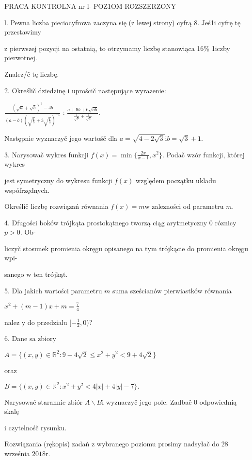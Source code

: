 \documentclass[a4paper,12pt]{article}
\begin{document}
PRACA KONTROLNA nr l- POZ1OM ROZSZERZONY

l. Pewna liczba pieciocyfrowa zaczyna się ($\mathrm{z}$ lewej strony) cyfrą 8. Jeś1i cyfrę tę przestawimy

$\mathrm{z}$ pierwszej pozycji na ostatnią, to otrzymamy liczbę stanowiąca 16\% 1iczby pierwotnej.

Znalez/č tę liczbę.

2. Określič dziedzinę $\mathrm{i}$ uprościč następujące wyrazenie:

$\displaystyle \frac{(\sqrt{a}+\sqrt{b})^{2}-4b}{(a-b)(\sqrt{\frac{1}{b}}+3\sqrt{\frac{1}{a}})^{-1}}$ : $\displaystyle \frac{a+9b+6\sqrt{ab}}{\frac{1}{\sqrt{b}}+\frac{1}{\sqrt{a}}}.$

Następnie wyznaczyč jego wartośč dla $a=\sqrt{4-2\sqrt{3}} \mathrm{i} b=\sqrt{3}+1.$

3. Narysowač wykres funkcji $f(x) = \displaystyle \min\{\frac{2x}{x-1},x^{2}\}$. Podač wzór funkcji, której wykres

jest symetryczny do wykresu funkcji $f(x)$ względem początku ukladu wspófrzędnych.

Określič liczbę rozwiązań równania $f(x)=m\mathrm{w}$ zalezności od parametru $m.$

4. Dfugości boków trójkąta prostokątnego tworzą ciąg arytmetyczny $0$ róznicy $p>0$. Ob-

liczyč stosunek promienia okręgu opisanego na $\mathrm{t}\mathrm{y}\mathrm{m}$ trójkącie do promienia okręgu wpi-

sanego $\mathrm{w}$ ten trójkąt.

5. Dla jakich wartości parametru $m$ suma sześcianów pierwiastków równania

$x^{2}+(m-1)x+m=\displaystyle \frac{7}{4}$

nalez $\mathrm{y}$ do przedzialu $[-\displaystyle \frac{1}{2},0$)?

6. Dane sa zbiory

$A=\{(x,y)\in \mathbb{R}^{2}:9-4\sqrt{2}\leq x^{2}+y^{2}<9+4\sqrt{2}\}$

oraz

$B=\{(x,y)\in \mathbb{R}^{2}:x^{2}+y^{2}<4|x|+4|y|-7\}.$

Narysowač starannie zbiór $A\backslash B \mathrm{i}$ wyznaczyč jego pole. Zadbač $0$ odpowiednią skalę

$\mathrm{i}$ czytelnośč rysunku.

Rozwiązania (rękopis) zadań $\mathrm{z}$ wybranego poziomu prosimy nadsyłač do 28 września $2018\mathrm{r}.$
\end{document}
